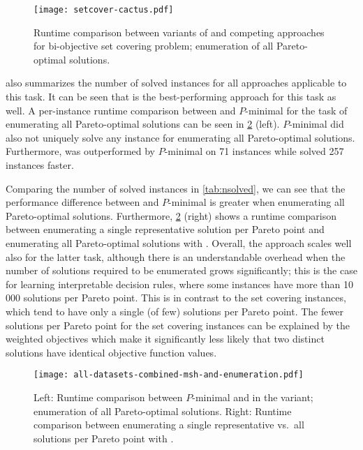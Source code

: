 \begin{figure}
  \centering
  \texttt{[image: setcover-cactus.pdf]}
  \caption{Runtime comparison between variants of \algname{} and competing approaches for bi-objective set covering problem;
    enumeration of all Pareto-optimal solutions.
  }\label{fig:setcover-cactus-multi}
\end{figure}

 also summarizes the number of solved instances for all approaches applicable to this task.
It can be seen that \msh{} is the best-performing approach for this task as well.
A per-instance runtime comparison between \msh{} and $P$-minimal for the task of enumerating all Pareto-optimal solutions can be seen in \cref{fig:combined-msh-scatter-single-multi} (left).
$P$-minimal did also not uniquely solve any instance for enumerating all Pareto-optimal solutions.
Furthermore, \msh{} was outperformed by $P$-minimal on 71 instances while \msh{} solved 257 instances faster.

Comparing the number of solved instances in \cref{tab:nsolved}, we can see that the performance difference between \algname{} and $P$-minimal is greater when enumerating all Pareto-optimal solutions.
Furthermore, \cref{fig:combined-msh-scatter-single-multi} (right) shows a runtime comparison between enumerating a single representative solution per Pareto point and enumerating all Pareto-optimal solutions with \msh{}.
Overall, the approach scales well also for the latter task, although there is an understandable overhead when the number of solutions required to be enumerated grows significantly;
this is the case for learning interpretable decision rules, where some instances have more than 10\,000 solutions per Pareto point.
This is in contrast to the set covering instances, which tend to have only a single (of few) solutions per Pareto point.
The fewer solutions per Pareto point for the set covering instances can be explained by the weighted objectives which make it significantly less likely that two distinct solutions have identical objective function values.

\begin{figure}
  \centering
  \texttt{[image: all-datasets-combined-msh-and-enumeration.pdf]}
  \caption{Left: Runtime comparison between $P$-minimal and \algname{} in the \msh{} variant; 
    enumeration of all Pareto-optimal solutions.
    Right: Runtime comparison between enumerating a single representative vs.\ all solutions per Pareto point with \msh{}.}\label{fig:combined-msh-scatter-single-multi}
\end{figure}

